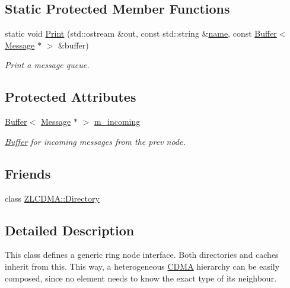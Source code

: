 \subsection*{Static Protected Member Functions}
\begin{DoxyCompactItemize}
\item 
static void \hyperlink{class_simulator_1_1_z_l_c_d_m_a_1_1_node_a1498e3ce63ebb31b62b321f9afb48f7b}{Print} (std\+::ostream \&out, const std\+::string \&\hyperlink{mtconf_8c_a8f8f80d37794cde9472343e4487ba3eb}{name}, const \hyperlink{class_simulator_1_1_buffer}{Buffer}$<$ \hyperlink{union_simulator_1_1_z_l_c_d_m_a_1_1_node_1_1_message}{Message} $\ast$ $>$ \&buffer)
\begin{DoxyCompactList}\small\item\em Print a message queue. \end{DoxyCompactList}\end{DoxyCompactItemize}
\subsection*{Protected Attributes}
\begin{DoxyCompactItemize}
\item 
\hyperlink{class_simulator_1_1_buffer}{Buffer}$<$ \hyperlink{union_simulator_1_1_z_l_c_d_m_a_1_1_node_1_1_message}{Message} $\ast$ $>$ \hyperlink{class_simulator_1_1_z_l_c_d_m_a_1_1_node_a033d8f12b4fcb82e41b7dfe5dcb6b828}{m\+\_\+incoming}
\begin{DoxyCompactList}\small\item\em \hyperlink{class_simulator_1_1_buffer}{Buffer} for incoming messages from the prev node. \end{DoxyCompactList}\end{DoxyCompactItemize}
\subsection*{Friends}
\begin{DoxyCompactItemize}
\item 
class \hyperlink{class_simulator_1_1_z_l_c_d_m_a_1_1_node_a1c8d2b869e248d4ee4a7b637c7252d62}{Z\+L\+C\+D\+M\+A\+::\+Directory}
\end{DoxyCompactItemize}


\subsection{Detailed Description}
This class defines a generic ring node interface. Both directories and caches inherit from this. This way, a heterogeneous \hyperlink{class_simulator_1_1_c_d_m_a}{C\+D\+M\+A} hierarchy can be easily composed, since no element needs to know the exact type of its neighbour. 

